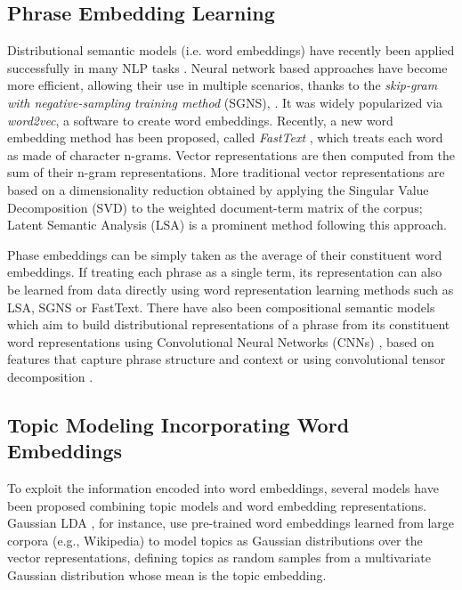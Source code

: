\documentclass[letterpaper]{article}
\begin{document}
\subsection{Phrase Embedding Learning}

Distributional semantic models (i.e. word embeddings) have recently been applied successfully in many NLP tasks \cite{Levy15}. Neural network based approaches have become more efficient, allowing their use in multiple scenarios, thanks to the \textit{skip-gram with negative-sampling training method} (SGNS), \cite{Mikolov13a,Mikolov13b}. It was widely popularized via \textit{word2vec}, a software to create word embeddings. Recently, a new word embedding method has been proposed, called \textit{FastText} \cite{Joulin16}, which treats each word as made of character n-grams. Vector representations are then computed from the sum of their n-gram representations.
More traditional vector representations are based on a dimensionality reduction obtained by applying the Singular Value Decomposition (SVD) to the weighted document-term matrix of the corpus; Latent Semantic Analysis (LSA) \cite{Deerwester90} is a prominent method following this approach.

Phase embeddings can be simply taken as the average of their constituent word embeddings. If treating each phrase as a single term, its representation can also be learned from data directly using word representation learning methods such as LSA, SGNS or FastText. There have also been compositional semantic models which aim to build distributional representations of a phrase from its constituent
word representations using Convolutional Neural Networks (CNNs) \cite{le2014distributed}, based on features that capture phrase structure and context \cite{yu2015learning} or using convolutional tensor decomposition \cite{huang2016unsupervised}.

\subsection{Topic Modeling Incorporating Word Embeddings}

To exploit the information encoded into word embeddings, several models have been proposed combining topic models and word embedding representations. Gaussian LDA \cite{Das15}, for instance, use pre-trained word embeddings learned from large corpora (e.g., Wikipedia) to model topics as Gaussian distributions over the vector representations, defining topics as random samples from a multivariate Gaussian distribution whose mean is the topic embedding.
\end{document}

